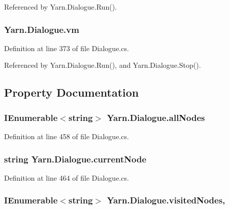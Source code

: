 Referenced by Yarn.\-Dialogue.\-Run().

\hypertarget{a00086_a8c1319357a9df6cff051328fb33224c7}{
\subsubsection[{vm}]{ Yarn.\-Dialogue.\-vm\hspace{0.3cm}{\ttfamily [private]}}}\label{a00086_a8c1319357a9df6cff051328fb33224c7}


Definition at line 373 of file Dialogue.\-cs.



Referenced by Yarn.\-Dialogue.\-Run(), and Yarn.\-Dialogue.\-Stop().



\subsection{Property Documentation}
\hypertarget{a00086_a0ee573e3d072bccf98ba1d975612d42c}{
\subsubsection[{all\-Nodes}]{\setlength{\rightskip}{0pt plus 5cm}I\-Enumerable$<$string$>$ Yarn.\-Dialogue.\-all\-Nodes\hspace{0.3cm}{\ttfamily [get]}}}\label{a00086_a0ee573e3d072bccf98ba1d975612d42c}


Definition at line 458 of file Dialogue.\-cs.

\hypertarget{a00086_af368b5c342d585dc6953876c5965ccc8}{
\subsubsection[{current\-Node}]{\setlength{\rightskip}{0pt plus 5cm}string Yarn.\-Dialogue.\-current\-Node\hspace{0.3cm}{\ttfamily [get]}}}\label{a00086_af368b5c342d585dc6953876c5965ccc8}


Definition at line 464 of file Dialogue.\-cs.

\hypertarget{a00086_ac5661051e0b7f44527fe526c7766dbbf}{
\subsubsection[{visited\-Nodes}]{\setlength{\rightskip}{0pt plus 5cm}I\-Enumerable$<$string$>$ Yarn.\-Dialogue.\-visited\-Nodes\hspace{0.3cm}{\ttfamily [get]}, {\ttfamily [set]}}}\label{a00086_ac5661051e0b7f44527fe526c7766dbbf}



